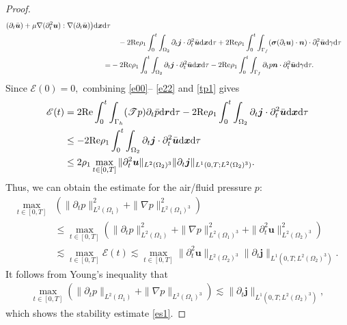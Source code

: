 \documentclass[final,leqno]{siamltex}
\begin{document}
\begin{proof}
\begin{align}
(\partial_t  \bar {\boldsymbol u})
 + \mu  \nabla (\partial_t^2 \boldsymbol u) : \nabla (\partial_t \bar
{\boldsymbol u})\big) {\rm d} \boldsymbol x  {\rm d} \tau \nonumber\\
 &\quad- 2 {\rm Re} \rho_1\int_0^t \int_{\Omega_2} \partial_t \boldsymbol j
\cdot \partial_t^2 \bar {\boldsymbol u} {\rm d} \boldsymbol x  {\rm d} \tau
 + 2 {\rm Re} {\rho_1 }\int_0^t \int_{\Gamma_f} (\boldsymbol \sigma (\partial_t
\boldsymbol u) \cdot \boldsymbol n) \cdot \partial_t^2 \bar {\boldsymbol u} {\rm
d} \gamma {\rm d} \tau  \nonumber  \\
 =& - 2 {\rm Re} \rho_1\int_0^t \int_{\Omega_2} \partial_t \boldsymbol j  \cdot
\partial_t^2 \bar {\boldsymbol u} {\rm d} \boldsymbol x  {\rm d} \tau -
  2 {\rm Re }\rho_1 \int_0^t \int_{\Gamma_f} \partial_t p \boldsymbol n \cdot
\partial_t^2  \bar {\boldsymbol u} {\rm d} \gamma {\rm d} \tau. \label{e22}
\end{align}
Since $\mathscr E (0)=0,$ combining \eqref{e00}-- \eqref{e22} and \eqref{tp1} gives
\begin{align*}
\mathscr E (t)
&= 2 {\rm Re} \int_0^t \int_{\Gamma_h} (\mathscr T p) \partial_t  \bar p {\rm d}
\boldsymbol r  {\rm d} \tau  -2 {\rm Re} \rho_1 \int_0^t \int_{\Omega_2}
\partial_t \boldsymbol j \cdot
\partial_t^2 \bar {\boldsymbol u} {\rm d} \boldsymbol  x  {\rm d} \tau\\
& \leq   - 2 {\rm Re} \rho_1\int_0^t \int_{\Omega_2} \partial_t \boldsymbol j
\cdot\partial_t^2 \bar {\boldsymbol u} {\rm d} \boldsymbol  x  {\rm d} \tau \\
& \leq 2 \rho_1 \max \limits_{t \in [0, T]} \|\partial_t^2  {\boldsymbol
u}\|_{L^2 (\Omega_2)^3} \|\partial_t \boldsymbol j \|_{ L^1 (0, T; L^2
(\Omega_2)^3)}.
\end{align*}
Thus, we can obtain the estimate for the air/fluid pressure $p$:
\begin{align*}
 \max \limits_{t\in[0, T]}&
 \left( \| \partial_t p\|^2_{L^2 (\Omega_1)} + \|\nabla p\|^2_{L^2 (\Omega_1)^3
}  \right)\\
&\leq \max \limits_{t\in[0, T]} \left( \| \partial_t p\|^2_{L^2 (\Omega_1)} +
\|\nabla p\|^2_{L^2 (\Omega_1)^3 } + \|\partial_t^2 \boldsymbol u \|^2_{L^2
(\Omega_2)^3} \right)\\
&\lesssim \max \limits_{t\in[0, T]} \mathscr E (t)
 \lesssim  \max \limits_{t \in [0, T]} \|\partial_t^2  {\boldsymbol u}\|_{L^2
(\Omega_2)^3} \|\partial_t \boldsymbol j \|_{L^1 (0, T; L^2 (\Omega_2)^3)}.
\end{align*}
It follows from Young's inequality that
\begin{align*}
 \max \limits_{t\in[0, T]}
 \left( \| \partial_t p\|_{L^2 (\Omega_1)} + \|\nabla p\|_{L^2 (\Omega_1)^3 }
\right)  \lesssim  \|\partial_t \boldsymbol j \|_{ L^1 (0, T; L^2(\Omega_2)^3)},
\end{align*}
which shows the stability estimate \eqref{es1}.


\end{proof}
\end{document}
